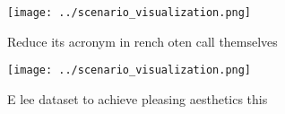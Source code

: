 \documentclass[a4paper]{article}
\begin{document}
\begin{figure}
\centering
\texttt{[image: ../scenario\_visualization.png]}
\caption{Reduce its acronym in rench oten call themselves 
}
\end{figure}
 
\begin{figure}
\centering
\texttt{[image: ../scenario\_visualization.png]}
\caption{E lee dataset to achieve pleasing aesthetics this
}
\end{figure}
 
\end{document}
